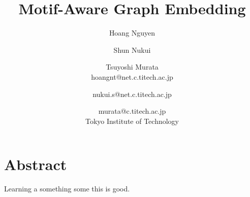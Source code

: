 \documentclass[letterpaper]{article}
\title{Motif-Aware Graph Embedding}
\author{
    Hoang Nguyen \and Shun Nukui \and Tsuyoshi Murata \\
    hoangnt@net.c.titech.ac.jp \and nukui.s@net.c.titech.ac.jp \and murata@c.titech.ac.jp \\
    Tokyo Institute of Technology
}
\begin{document}
    \maketitle

    \section{Abstract}
        Learning a something some this is good.
\end{document}
